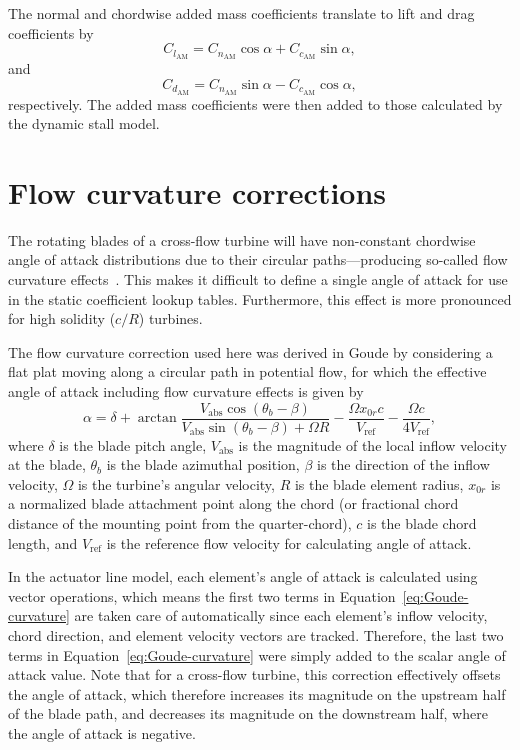 \documentclass[times]{weauth}
\begin{document}
The normal and chordwise added mass coefficients translate to lift and drag
coefficients by
\begin{equation}
    C_{l_\mathrm{AM}} = C_{n_\mathrm{AM}} \cos \alpha + C_{c_\mathrm{AM}} \sin
    \alpha,
\end{equation}
and
\begin{equation}
    C_{d_\mathrm{AM}} = C_{n_\mathrm{AM}} \sin \alpha - C_{c_\mathrm{AM}} \cos
    \alpha,
\end{equation}
respectively. The added mass coefficients were then added to those calculated by
the dynamic stall model.


\section{Flow curvature corrections}

The rotating blades of a cross-flow turbine will have non-constant chordwise
angle of attack distributions due to their circular paths---producing so-called
flow curvature effects~\cite{Migliore1980}. This makes it difficult to define a
single angle of attack for use in the static coefficient lookup tables.
Furthermore, this effect is more pronounced for high solidity ($c/R$) turbines.

The flow curvature correction used here was derived in Goude \cite{Goude2012} by
considering a flat plat moving along a circular path in potential flow, for
which the effective angle of attack including flow curvature effects is given by
\begin{equation}
    \alpha = \delta + \arctan \frac{V_\mathrm{abs} \cos(\theta_b -
        \beta)}{V_\mathrm{abs} \sin(\theta_b - \beta) + \Omega R} - \frac{\Omega
        x_{0r}c}{V_\mathrm{ref}} - \frac{\Omega c}{4 V_\mathrm{ref}},
    \label{eq:Goude-curvature}
\end{equation}
where $\delta$ is the blade pitch angle, $V_\mathrm{abs}$ is the magnitude of
the local inflow velocity at the blade, $\theta_b$ is the blade azimuthal
position, $\beta$ is the direction of the inflow velocity, $\Omega$ is the
turbine's angular velocity, $R$ is the blade element radius, $x_{0r}$ is a
normalized blade attachment point along the chord (or fractional chord distance
of the mounting point from the quarter-chord), $c$ is the blade chord length,
and $V_\mathrm{ref}$ is the reference flow velocity for calculating angle of
attack.

In the actuator line model, each element's angle of attack is calculated using
vector operations, which means the first two terms in
Equation~\ref{eq:Goude-curvature} are taken care of automatically since each
element's inflow velocity, chord direction, and element velocity vectors are
tracked. Therefore, the last two terms in Equation~\ref{eq:Goude-curvature} were
simply added to the scalar angle of attack value. Note that for a cross-flow
turbine, this correction effectively offsets the angle of attack, which
therefore increases its magnitude on the upstream half of the blade path, and
decreases its magnitude on the downstream half, where the angle of attack is
negative.
\end{document}
